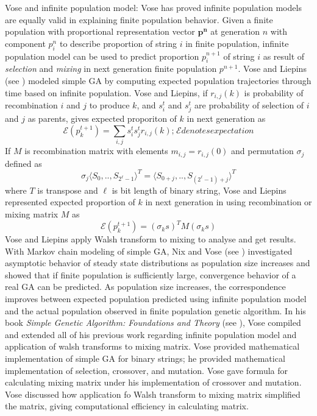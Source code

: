 Vose and infinite population model:
Vose has proved infinite population models are equally valid in explaining finite population behavior. 
Given a finite population with proportional representation vector $\bm{p^n}$ at generation $n$ with 
component $p_i^n$ to describe proportion of string $i$ in finite population, infinite population model 
can be used to predict proportion $p_i^{n+1}$ of string $i$ as result of \textit{selection} and 
\textit{mixing} in next generation finite population $p^{n+1}$. Vose and Liepins (see \cite{VoseLiepins1991}) 
modeled simple GA by computing expected population trajectories through time based on infinite population. 
Vose and Liepins, if $r_{i,j}(k)$ is probability of recombination $i$ and $j$ to produce $k$, and $s_i^t$ and $s_j^t$ 
are probability of selection of $i$ and $j$ as parents, gives expected proporiton of $k$ in next generation as
\[
\mathcal{E}(p_k^{t+1}) = \sum_{i,j} s_i^t s_j^t r_{i,j}(k) ; \hspace{1pt} \mathcal{E} denotes expectation
\]
If $M$ is recombination matrix with elements $m_{i,j} = r_{i,j}(0)$ and permutation $\sigma_j$ defined as 
\[
\sigma_j{\langle S_0,..,S_{2^\ell - 1} \rangle}^{T} = {\langle S_{0+j},..,S_{(2^\ell - 1)+j} \rangle}^{T}
\]
where $T$ is transpose and $\ell$ is bit length of binary string, Vose and Liepins represented expected proportion 
of $k$ in next generation in using recombination or mixing matrix $M$ as
\[
\mathcal{E}(p_k^{t+1}) = (\sigma_k s)^T M (\sigma_k s)
\]
Vose and Liepins apply Walsh transform to mixing to analyse and get results. 
With Markov chain modeling of simple GA, Nix and Vose (see \cite{Nix1992}) investigated asymptotic behavior of steady 
state distributions as population size increases and showed that if finite population is sufficiently large, 
convergence behavior of a real GA can be predicted. As population size increases, the correspondence improves 
between expected population predicted using infinite population model and the actual population observed in 
finite population genetic algorithm. In his book \textit{Simple Genetic Algorithm: Foundations and Theory} (see \cite{Vose1999}), Vose compiled and extended all of his previous work regarding infinite population model and application of walsh transforms to mixing matrix. Vose provided mathematical implementation of simple GA for binary strings; he provided mathematical implementation of selection, crossover, and mutation. Vose gave formula for calculating mixing matrix under his implementation of crossover and mutation. Vose discussed how application fo Walsh transform to mixing matrix simplified the matrix, giving computational efficiency in calculating matrix.

